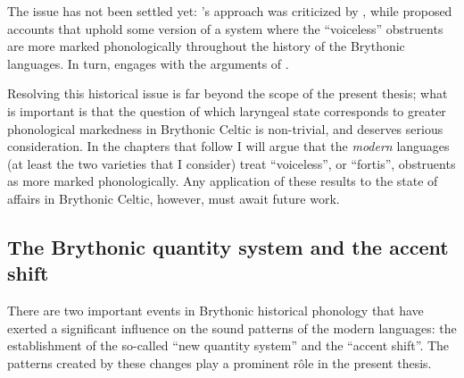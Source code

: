 The issue has not been settled yet: \citeauthor{lheb}'s approach was criticized by \citet{harvey84,thomasa,schrijver}, while \citet{koch-prosody,koch89,koch90,isaac,isaac08:_bryth} proposed accounts that uphold some version of a system where the \enquote{voiceless} obstruents are more marked phonologically throughout the history of the Brythonic languages. In turn, \citet{sims-williams08,sims-williams10:_welsh} engages with the arguments of \citet{isaac,isaac08:_bryth}.

Resolving this historical issue is far beyond the scope of the present thesis; what is important is that the question of which laryngeal state corresponds to greater phonological markedness in Brythonic Celtic is non\hyp trivial, and deserves serious consideration. In the chapters that follow I will argue that the \emph{modern} languages (at least the two varieties that I consider) treat \enquote{voiceless}, or \enquote{fortis}, obstruents as more marked phonologically. Any application of these results to the state of affairs in Brythonic Celtic, however, must await future work.

\subsection{The Brythonic quantity system and the accent shift}
\label{sec:bryth-quant-syst}

There are two important events in Brythonic historical phonology that have exerted a significant influence on the sound patterns of the modern languages: the establishment of the so\hyp called \enquote{new quantity system} and the \enquote{accent shift}. The patterns created by these changes play a prominent rôle in the present thesis.

